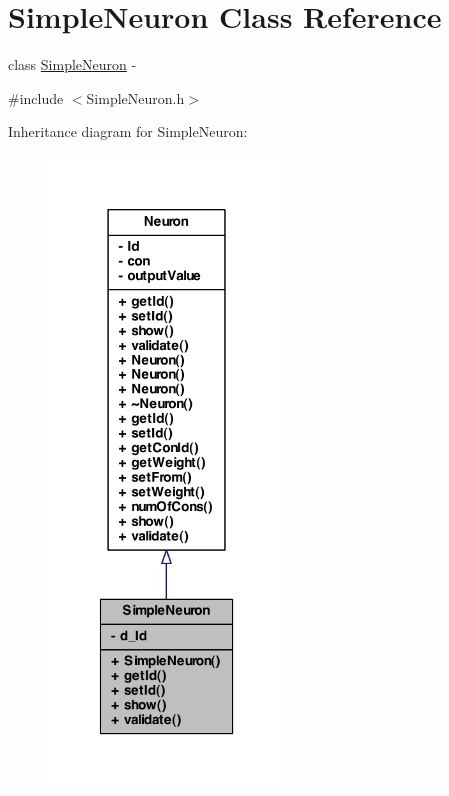 \hypertarget{class_simple_neuron}{
\section{SimpleNeuron Class Reference}
\label{class_simple_neuron}
}


class \hyperlink{class_simple_neuron}{SimpleNeuron} -\/  




{\ttfamily \#include $<$SimpleNeuron.h$>$}



Inheritance diagram for SimpleNeuron:
\nopagebreak
\begin{figure}[H]
\begin{center}
\leavevmode
\includegraphics[width=178pt]{class_simple_neuron__inherit__graph}
\end{center}
\end{figure}


